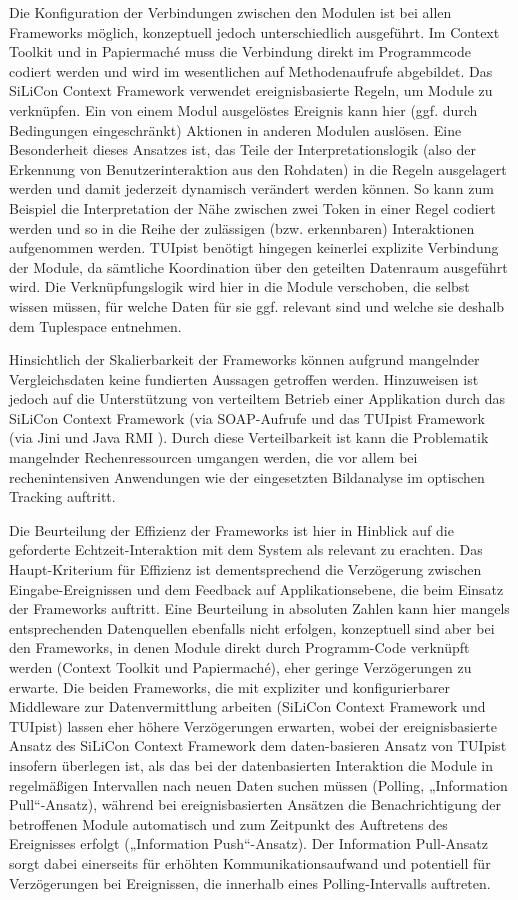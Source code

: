 Die Konfiguration der Verbindungen zwischen den Modulen ist bei allen Frameworks möglich, konzeptuell jedoch unterschiedlich ausgeführt. Im Context Toolkit und in Papiermaché muss die Verbindung direkt im Programmcode codiert werden und wird im wesentlichen auf Methodenaufrufe abgebildet. Das SiLiCon Context Framework verwendet ereignisbasierte Regeln, um Module zu verknüpfen. Ein von einem Modul ausgelöstes Ereignis kann hier (ggf. durch Bedingungen eingeschränkt) Aktionen in anderen Modulen auslösen. Eine Besonderheit dieses Ansatzes ist, das Teile der Interpretationslogik (also der Erkennung von Benutzerinteraktion aus den Rohdaten) in die Regeln ausgelagert werden und damit jederzeit dynamisch verändert werden können. So kann zum Beispiel die Interpretation der Nähe zwischen zwei Token in einer Regel codiert werden und so in die Reihe der zulässigen (bzw. erkennbaren) Interaktionen aufgenommen werden. TUIpist benötigt hingegen keinerlei explizite Verbindung der Module, da sämtliche Koordination über den geteilten Datenraum ausgeführt wird. Die Verknüpfungslogik wird hier in die Module verschoben, die selbst wissen müssen, für welche Daten für sie ggf. relevant sind und welche sie deshalb dem Tuplespace entnehmen.

Hinsichtlich der Skalierbarkeit der Frameworks können aufgrund mangelnder Vergleichsdaten keine fundierten Aussagen getroffen werden. Hinzuweisen ist jedoch auf die Unterstützung von verteiltem Betrieb einer Applikation durch das SiLiCon Context Framework (via SOAP-Aufrufe \citep{Curbera02} und das TUIpist Framework (via Jini und Java \gls{RMI} \citep{Downing98}). Durch diese Verteilbarkeit ist kann die Problematik mangelnder Rechenressourcen umgangen werden, die vor allem bei rechenintensiven Anwendungen wie der eingesetzten Bildanalyse im optischen Tracking auftritt.

Die Beurteilung der Effizienz der Frameworks ist hier in Hinblick auf die geforderte Echtzeit-Interaktion mit dem System als relevant zu erachten. Das Haupt-Kriterium für Effizienz ist dementsprechend die Verzögerung zwischen Eingabe-Ereignissen und dem Feedback auf Applikationsebene, die beim Einsatz der Frameworks auftritt. Eine Beurteilung in absoluten Zahlen kann hier mangels entsprechenden Datenquellen ebenfalls nicht erfolgen, konzeptuell sind aber bei den Frameworks, in denen Module direkt durch Programm-Code verknüpft werden (Context Toolkit und Papiermaché), eher geringe Verzögerungen zu erwarte. Die beiden Frameworks, die mit expliziter und konfigurierbarer Middleware zur Datenvermittlung arbeiten (SiLiCon Context Framework und TUIpist) lassen eher höhere Verzögerungen erwarten, wobei der ereignisbasierte Ansatz des SiLiCon Context Framework dem daten-basieren Ansatz von TUIpist insofern überlegen ist, als das bei der datenbasierten Interaktion die Module in regelmäßigen Intervallen nach neuen Daten suchen müssen (Polling, „Information Pull“-Ansatz), während bei ereignisbasierten Ansätzen die Benachrichtigung der betroffenen Module automatisch und zum Zeitpunkt des Auftretens des Ereignisses erfolgt („Information Push“-Ansatz). Der Information Pull-Ansatz sorgt dabei einerseits für erhöhten Kommunikationsaufwand und potentiell für Verzögerungen bei Ereignissen, die innerhalb eines Polling-Intervalls auftreten.

